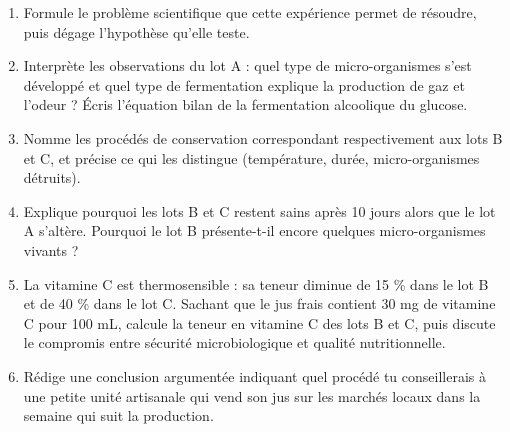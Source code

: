 \documentclass[11pt]{article}
\begin{document}
\begin{exercice}
\begin{enumerate}
\item Formule le problème scientifique que cette expérience permet de résoudre, puis dégage l'hypothèse qu'elle teste.
\item Interprète les observations du lot A : quel type de micro-organismes s'est développé et quel type de fermentation explique la production de gaz et l'odeur ? Écris l'équation bilan de la fermentation alcoolique du glucose.
\item Nomme les procédés de conservation correspondant respectivement aux lots B et C, et précise ce qui les distingue (température, durée, micro-organismes détruits).
\item Explique pourquoi les lots B et C restent sains après 10 jours alors que le lot A s'altère. Pourquoi le lot B présente-t-il encore quelques micro-organismes vivants ?
\item La vitamine C est thermosensible : sa teneur diminue de 15 \% dans le lot B et de 40 \% dans le lot C. Sachant que le jus frais contient 30 mg de vitamine C pour 100 mL, calcule la teneur en vitamine C des lots B et C, puis discute le compromis entre sécurité microbiologique et qualité nutritionnelle.
\item Rédige une conclusion argumentée indiquant quel procédé tu conseillerais à une petite unité artisanale qui vend son jus sur les marchés locaux dans la semaine qui suit la production.
\end{enumerate}
\end{exercice}
\end{document}
